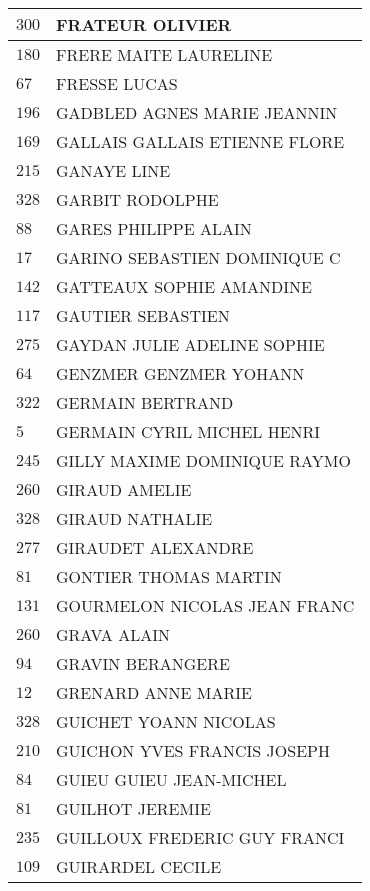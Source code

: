 \begin{xltabular}{\linewidth}{|l|X|}
    \hline
    $300$ & FRATEUR OLIVIER \\
    \hline
    $180$ & FRERE MAITE LAURELINE \\
    \hline
    $67$ & FRESSE LUCAS \\
    \hline
    $196$ & GADBLED AGNES MARIE JEANNIN \\
    \hline
    $169$ & GALLAIS GALLAIS ETIENNE FLORE \\
    \hline
    $215$ & GANAYE LINE \\
    \hline
    $328$ & GARBIT RODOLPHE \\
    \hline
    $88$ & GARES PHILIPPE ALAIN \\
    \hline
    $17$ & GARINO SEBASTIEN DOMINIQUE C \\
    \hline
    $142$ & GATTEAUX SOPHIE AMANDINE \\
    \hline
    $117$ & GAUTIER SEBASTIEN \\
    \hline
    $275$ & GAYDAN JULIE ADELINE SOPHIE \\
    \hline
    $64$ & GENZMER GENZMER YOHANN \\
    \hline
    $322$ & GERMAIN BERTRAND \\
    \hline
    $5$ & GERMAIN CYRIL MICHEL HENRI \\
    \hline
    $245$ & GILLY MAXIME DOMINIQUE RAYMO \\
    \hline
    $260$ & GIRAUD AMELIE \\
    \hline
    $328$ & GIRAUD NATHALIE \\
    \hline
    $277$ & GIRAUDET ALEXANDRE \\
    \hline
    $81$ & GONTIER THOMAS MARTIN \\
    \hline
    $131$ & GOURMELON NICOLAS JEAN FRANC \\
    \hline
    $260$ & GRAVA ALAIN \\
    \hline
    $94$ & GRAVIN BERANGERE \\
    \hline
    $12$ & GRENARD ANNE MARIE \\
    \hline
    $328$ & GUICHET YOANN NICOLAS \\
    \hline
    $210$ & GUICHON YVES FRANCIS JOSEPH \\
    \hline
    $84$ & GUIEU GUIEU JEAN-MICHEL \\
    \hline
    $81$ & GUILHOT JEREMIE \\
    \hline
    $235$ & GUILLOUX FREDERIC GUY FRANCI \\
    \hline
    $109$ & GUIRARDEL CECILE \\

\end{xltabular}
